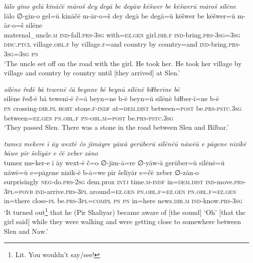 \ea \label{ŽP.166}
\textit{lālo gino gelū kināčē māroš dey degā be degāw kēšwer be kēšwerū māroš silēne} \\ 
\gll lālo ∅-gin-o gel=ū kināčē m-ār-o=š dey degā be degā=ū kēšwer be kēšwer=ū m-ār-o=š silēne \\ 
 maternal\_uncle\textsc{.m} \textsc{ind-}fall\textsc{.prs}\textsc{-3sg} with\textsc{\textsc{=ez.gen}} girl\textsc{.dir}\textsc{.f} \textsc{ind-}bring\textsc{.prs}\textsc{-3sg}\textsc{=3sg} \textsc{disc.ptcl} village\textsc{.obl}\textsc{.f} by village\textsc{.f}=and country by country=and \textsc{ind-}bring\textsc{.prs}\textsc{-3sg}\textsc{=3sg} \textsc{pn} \\ 
\glt `The uncle set off on the road with the girl. He took her. He took her village by village and country by country until [they arrived] at Slen.'
\z 
 
\ea \label{ŽP.167}
\textit{silēne řeđē bā tewenē čā beynne bē beynū silēnē biɫberīne bē} \\ 
\gll silēne řeđ-ē bā tewenī-ē č=ā beyn=ne b-ē beyn=ū silēnē biɫber-ī=ne b-ē \\ 
 \textsc{pn} crossing\textsc{-dir}\textsc{.pl} \textsc{hort} stone\textsc{.f}\textsc{-indf} at=\textsc{dem.dist} between\textsc{=\textsc{post}} be\textsc{.prs}\textsc{-pstc}\textsc{.3sg} between\textsc{\textsc{=ez.gen}} \textsc{pn}\textsc{.obl}\textsc{.f} \textsc{pn}\textsc{-obl}\textsc{.m}\textsc{=\textsc{post}} be\textsc{.prs}\textsc{-pstc}\textsc{.3sg} \\ 
\glt `They passed Slen. There was a stone in the road between Slen and Bilbar.'
\z 
 
\ea \label{ŽP.175}
\textit{tumez mekere ī āy wextē čo jimāyre yāwā gerūberū silēnēū nāwēū e pāgene nizīkē bāwe pīr šelīyār e čē xeber zāno} \\ 
\gll tumez me-ker-e ī āy wext-ē č=o ∅-jim-ā=re ∅-yāw-ā gerūber=ū silēnē=ū nāwē=ū e=pāgene nizīk-ē b-ā=we pīr šelīyār e=čē xeber ∅-zān-o \\ 
 surprisingly \textsc{neg-}do\textsc{.prs}-\textsc{2sg} dem.prox \textsc{intj} time\textsc{.m}\textsc{-indf} in=\textsc{dem.dist} \textsc{ind-}move\textsc{.prs}\textsc{-3pl}\textsc{=\textsc{povb}} \textsc{ind-}arrive\textsc{.prs}\textsc{-3pl} around\textsc{\textsc{=ez.gen}} \textsc{pn}\textsc{.obl}\textsc{.f}\textsc{\textsc{=ez.gen}} \textsc{pn}\textsc{.obl}\textsc{.f}\textsc{\textsc{=ez.gen}} in=there close\textsc{\textsc{-pl}} be\textsc{.prs}\textsc{-3pl}\textsc{=compl} \textsc{pn} \textsc{pn} in=here news\textsc{.dir}\textsc{.m} \textsc{ind-}know\textsc{.prs}\textsc{-3sg} \\ 
\glt `It turned out\footnote{Lit. You wouldn’t say/see!} that he (Pir Shaliyar) became aware of [the sound] ‘Oh’ [that the girl said] while they were walking and were getting close to somewhere between Slen and Naw.'
\z 
 
